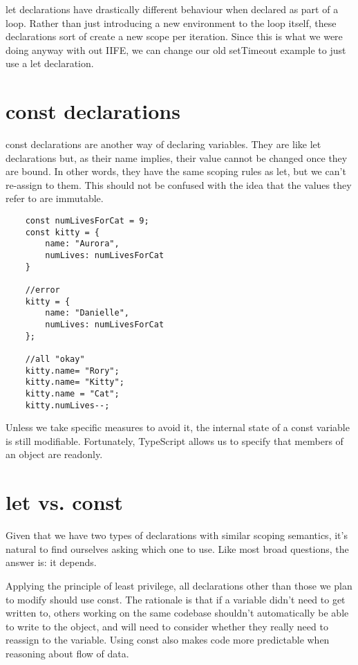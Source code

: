 let declarations have drastically different behaviour when declared as part of a loop. Rather than just introducing a new environment to the loop itself, these declarations sort of create a new scope per iteration. Since this is what we were doing anyway with out IIFE, we can change our old setTimeout example to just use a let declaration.

\section{const declarations}
const declarations are another way of declaring variables. They are like let declarations but, as their name implies, their value cannot be changed once they are bound. In other words, they have the same scoping rules as let, but we can't re-assign to them. This should not be confused with the idea that the values they refer to are immutable.

\begin{lstlisting}
    const numLivesForCat = 9;
    const kitty = {
        name: "Aurora",
        numLives: numLivesForCat
    }

    //error
    kitty = {
        name: "Danielle",
        numLives: numLivesForCat
    };

    //all "okay"
    kitty.name= "Rory";
    kitty.name= "Kitty";
    kitty.name = "Cat";
    kitty.numLives--;
\end{lstlisting}

Unless we take specific measures to avoid it, the internal state of a const variable is still modifiable. Fortunately, TypeScript allows us to specify that members of an object are readonly.

\section{let vs. const}
Given that we have two types of declarations with similar scoping semantics, it's natural to find ourselves asking which one to use. Like most broad questions, the answer is: it depends.

Applying the principle of least privilege, all declarations other than those we plan to modify should use const. The rationale is that if a variable didn't need to get written to, others working on the same codebase shouldn't automatically be able to write to the object, and will need to consider whether they really need to reassign to the variable. Using const also makes code more predictable when reasoning about flow of data.

